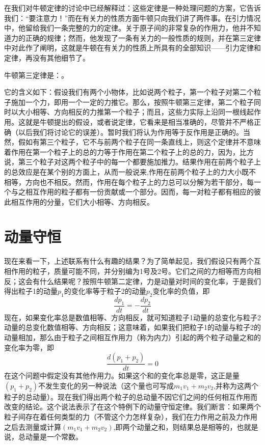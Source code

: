 在我们对牛顿定律的讨论中已经解释过：这些定律是一种处理问题的方案，它告诉我们：“要注意力！”而在有关力的性质方面牛顿只向我们讲了两件事。在引力情况中，他留给我们一条完整的力的定律。关于原子间的非常复杂的作用力，他并不知道力的正确的规律；然而，他发现了一条有关力的一般性质的规则，并在第三定律中对此作了阐明，这就是牛顿在有关力的性质上所具有的全部知识——引力定律和定律，再没有其他细节了。

牛顿第三定律是：。

它的含义如下：假设我们有两个小物体，比如说两个粒子，第一个粒子对第二个粒子施加一个力，即用一个一定的力推它。那么，按照牛顿第三定律，第二个粒子同时以大小相等、方向相反的力推第一个粒子；而且，这些力实际上沿同一根线起作用。这就是牛顿提出的假设，或者说定律，它看来是相当准确的，尽管并不严格正确（以后我们将讨论它的误差）。暂时我们将认为作用等于反作用是正确的。当然，假如有第三个粒子，它不与前两个粒子在同一条直线上，则这个定律并不意味着作用在第一个粒子上的总的力等于作用在第二个粒子上的总的力，因为，比方说，第三个粒子对这两个粒子中的每一个都要施加推力。结果作用在前两个粒子上的总效应是在某个别的方面上，从而一般说来,作用在前两个粒子上的力大小既不相等，方向也不相反。然而，作用在每个粒子上的力总可以分解为若干部分，每一个与之相互作用的粒子都有一份贡献或一个部分。因而，每一对粒子都有相应的彼此相互作用的分量，它们大小相等、方向相反。

\section{动量守恒}

现在来看一下，上述联系有什么有趣的结果？为了简单起见，我们假设只有两个互相作用的粒子，质量可能不同，并分别编为1号及2号。它们之间的力相等而方向相反；这会有什么结果呢？按照牛顿第二定律，力是动量对时间的变化率，于是我们得出粒子1的动量$p_1$的变化率等于粒子2的动量$p_2$变化率的负值，即
\begin{equation}
    \label{Eq:I:10:1}
    \frac{dp_1}{dt}=-\frac{dp_2}{dt}
\end{equation}
现在，如果变化率总是数值相等、方向相反，就可知道粒子1动量的总变化与粒子2动量的总变化数值相等、方向相反；这意味着，如果我们把粒子1的动量与粒子2的动量相加，那么由于粒子之间相互作用力（称为内力）引起的两个粒子动量之和的变化率为零，即
\begin{equation}
    \label{Eq:I:10:2}
    \frac{d(p_1+p_2)}{dt}=0
\end{equation}
在这个问题中假定没有其他作用力。如果这个和的变化率总是零，这正是量$(p_1+p_2)$不发生变化的另一种说法（这个量也可写成$m_1v_1+m_2v_2$,并称为这两个粒子的总动量）。现在我们得出两个粒子的总动量不因它们之间的任何相互作用而改变的结论。这个说法表示了在这个特例下的动量守恒定律。我们断言：如果两个粒子间存在着任何类型的力（不管这个力怎样复杂），我们在力作用之前及力作用之后去测量或计算$(m_1v_1+m_2v_2)$,即两个动量之和，则结果总是相等的，也就是说，总动量是一个常数。

